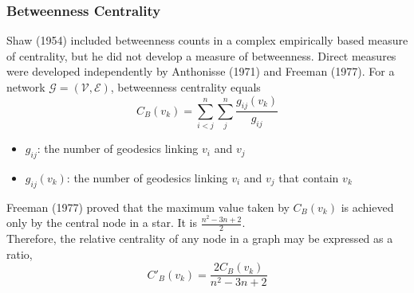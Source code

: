 \documentclass{beamer}
\begin{document}

\begin{frame}
\frametitle{Betweenness Centrality}
Shaw (1954) included betweenness counts in a complex empirically based measure of centrality, but he did not develop a measure of betweenness. Direct measures were developed independently by Anthonisse (1971) and Freeman (1977).	For a network $\mathcal{G}=(\mathcal{V},\mathcal{E})$, betweenness centrality equals
\color{iseblue}
\begin{displaymath}
C_{B}(v_{k})=\sum_{i<j}^n\sum_{j}^n \frac {g_{ij}(v_{k})}{g_{ij}}
\end{displaymath}
\color{black}
\begin{itemize}
\item $g_{ij}$: the number of geodesics linking $v_{i}$ and $v_{j}$
\item $g_{ij}(v_{k})$: the number of geodesics linking $v_{i}$ and $v_{j}$ that contain $v_{k}$
\end{itemize}
\end{frame}

\begin{frame}
Freeman (1977) proved that the maximum value taken by $C_{B}(v_{k})$ is achieved only by the central node in a star. It is $\frac {n^2-3n+2}{2}$.
\\
\bigskip
Therefore, the relative centrality of any node in a graph may be expressed as a ratio,
\color{iseblue}
\begin{displaymath}
C'_{B}(v_{k})=\frac{2C_{B}(v_{k})}{n^2-3n+2}
\end{displaymath}
\end{frame}

\end{document}
